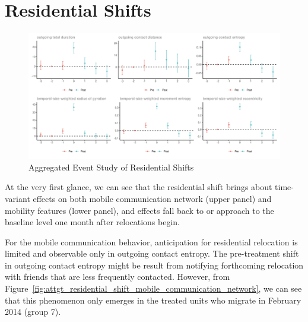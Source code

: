 \section{Residential Shifts}\label{main_res_residential_shift}
\begin{figure}[h!]
\centering
\caption{Aggregated Event Study of Residential Shifts}
\vspace{0.1cm}

\includegraphics[scale=0.49]{figures/csdid/residential_shift.png}

\label{fig:event_study_residential_shift}
\end{figure}

At the very first glance, we can see that the residential shift brings about time-variant effects on both mobile communication network (upper panel) and mobility features (lower panel), and effects fall back to or approach to the baseline level one month after relocations begin.

For the mobile communication behavior, anticipation for residential relocation is limited and observable only in outgoing contact entropy.
The pre-treatment shift in outgoing contact entropy might be result from notifying forthcoming relocation with friends that are less frequently contacted.
However, from Figure~\ref{fig:attgt_residential_shift_mobile_communication_network}, we can see that this phenomenon only emerges in the treated units who migrate in February 2014 (group 7).

